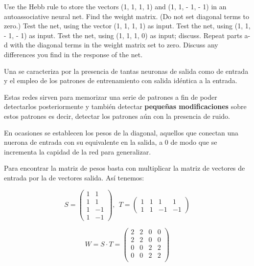 \begin{problem}[8]
Use the Hebb rule to store the vectors (1, 1, 1, 1) and (1, 1, - 1, - 1) in an autoassociative neural net.
\ppart Find the weight matrix. (Do not set diagonal terms to zero.)
\ppart Test the net, using the vector (1, 1, 1, 1) as input.
\ppart Test the net, using (1, 1, - 1, - 1) as input.
\ppart Test the net, using (1, 1, 1, 0) as input; discuss.
\ppart Repeat parts a-d with the diagonal terms in the weight matrix set to zero. Discuss any differences you find in the response of the net.

\solution
{}

Una  se caracteriza por la presencia de tantas neuronas de salida como de entrada y el empleo de los patrones de entrenamiento con salida idéntica a la entrada.

Estas redes sirven para memorizar una serie de patrones a fin de poder detectarlos posteriormente y también detectar \textbf{pequeñas modificaciones} sobre estos patrones es decir, detectar los patrones aún con la presencia de ruido.

En ocasiones se establecen los pesos de la diagonal, aquellos que conectan una nuerona de entrada con su equivalente en la salida, a 0 de modo que se incrementa la capidad de la red para generalizar.

\spart

Para encontrar la matriz de pesos basta con multiplicar la matriz de vectores de entrada por la de vectores salida. Así tenemos:

\[S = \left( \begin{array}{cc}
1 & 1 \\
1 & 1 \\
1 & -1 \\
1 & -1
\end{array}\right), \ \ T = \left( \begin{array}{cccc}
1 & 1 & 1 & 1 \\
1 & 1 & -1 & -1
\end{array}\right)\]

\[W = S\cdot T = \left( \begin{array}{cccc}
2 & 2 & 0 & 0 \\
2 & 2 & 0 & 0 \\
0 & 0 & 2 & 2 \\
0 & 0 & 2 & 2 \\
\end{array}\right)\]

\spart


\end{problem}
